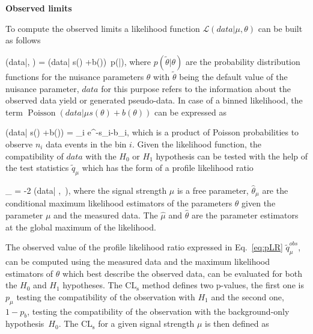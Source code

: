 \textbf{Observed limits}

To compute the observed limits a likelihood function $\mathcal{L}(data|\mu, \theta)$ can be built as follows~\cite{CMS-NOTE-2011-005}

{
(data|\mu, \theta) = (data| \mu s(\theta) +b(\theta))~p(\tilde{\theta}|\theta),
}
where $p(\tilde{\theta}|\theta)$ are the probability distribution functions for the nuisance parameters $\theta$ with $\tilde{\theta}$ being the default value of the nuisance parameter, $data$ for this purpose refers to the information about the observed data yield or generated pseudo-data. In case of a binned likelihood, the term $\operatorname{Poisson}(data| \mu s(\theta) +b(\theta))$ can be expressed as


{
(data| \mu s(\theta) +b(\theta))  = \prod_{i}  e^{-\mu s_{i}-b_{i}},
}
which is a product  of Poisson probabilities to observe $n_{i}$ data events in the bin $i$. Given the likelihood function, the compatibility of $data$ with the $H_{0}$ or $H_{1}$ hypothesis can be tested with the help of the test statistics $\tilde{q}_{\mu}$ which has the form of a profile likelihood ratio

{
_{\mu} = -2   {(data| \hat{\mu} ,~\hat{\theta})},
}
where the signal strength $\mu$ is a free parameter, $\hat{\theta}_{\mu}$ are the conditional maximum likelihood estimators of the parameters $\theta$ given the parameter $\mu$ and the measured data. The $\hat{\mu}$ and $\hat{\theta}$ are the parameter estimators at the global maximum of the likelihood. 
	  
The observed value of the profile likelihood ratio expressed in Eq.~\ref{eq:pLR} $\tilde{q}_{\mu}^{obs}$, can be computed using the measured data and the maximum likelihood estimators of $\theta$ which best describe the observed data, can be evaluated for both the $H_{0}$ and $H_{1}$ hypotheses. The $\mathrm{CL_{s}}$  method defines two p-values, the first one is $p_{\mu}$ testing the compatibility of the observation with $H_{1}$ and the second one, $1-p_{b}$, testing the compatibility of the observation with the background-only hypothesis~$H_{0}$. The $\mathrm{CL_{s}}$ for a given signal strength $\mu$ is then defined as

